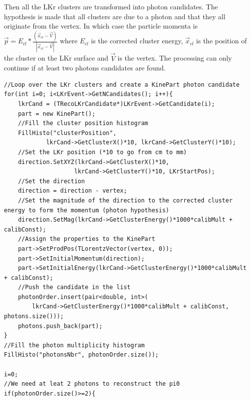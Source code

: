 Then all the LKr clusters are transformed into photon candidates. The hypothesis is made that all
clusters are due to a photon and that they all originate from the vertex. In which case the
particle momenta is 
$\vec{p}=E_{cl}*\frac{(\vec{x}_{cl}-\vec{V})}{\left|\vec{x}_{cl}-\vec{V}\right|}$ where $E_{cl}$ is
the corrected cluster energy, $\vec{x}_{cl}$ is the position of the cluster on the LKr surface and
$\vec{V}$ is the vertex. The processing can only continue if at least two photons candidates are
found.
\begin{lstlisting}
//Loop over the LKr clusters and create a KinePart photon candidate
for(int i=0; i<LKrEvent->GetNCandidates(); i++){
	lkrCand = (TRecoLKrCandidate*)LKrEvent->GetCandidate(i);
	part = new KinePart();
	//Fill the cluster position histogram
	FillHisto("clusterPosition", 
			lkrCand->GetClusterX()*10, lkrCand->GetClusterY()*10);
	//Set the LKr position (*10 to go from cm to mm)
	direction.SetXYZ(lkrCand->GetClusterX()*10, 
					lkrCand->GetClusterY()*10, LKrStartPos);
	//Set the direction
	direction = direction - vertex;
	//Set the magnitude of the direction to the corrected cluster energy to form the momentum (photon hypothesis)
	direction.SetMag(lkrCand->GetClusterEnergy()*1000*calibMult + calibConst);
	//Assign the properties to the KinePart
	part->SetProdPos(TLorentzVector(vertex, 0));
	part->SetInitialMomentum(direction);
	part->SetInitialEnergy(lkrCand->GetClusterEnergy()*1000*calibMult + calibConst);
	//Push the candidate in the list
	photonOrder.insert(pair<double, int>(
		lkrCand->GetClusterEnergy()*1000*calibMult + calibConst, photons.size()));
	photons.push_back(part);
}
//Fill the photon multiplicity histogram
FillHisto("photonsNbr", photonOrder.size());

i=0;
//We need at leat 2 photons to reconstruct the pi0
if(photonOrder.size()>=2){
\end{lstlisting}

